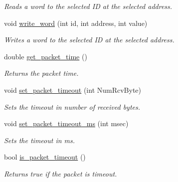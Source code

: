 \begin{DoxyCompactItemize}
\begin{DoxyCompactList}\small\item\em Reads a word to the selected I\+D at the selected address. \end{DoxyCompactList}\item 
void \hyperlink{classdynamixel_a925f62ce5e261e5ef4fe6dc46bdc7c63}{write\+\_\+word} (int id, int address, int value)
\begin{DoxyCompactList}\small\item\em Writes a word to the selected I\+D at the selected address. \end{DoxyCompactList}\item 
double \hyperlink{classdynamixel_a2fa5375537184c279a9ebfcfc0425071}{get\+\_\+packet\+\_\+time} ()
\begin{DoxyCompactList}\small\item\em Returns the packet time. \end{DoxyCompactList}\item 
void \hyperlink{classdynamixel_a067f82c21ed176e18fa224d16f3d1c5b}{set\+\_\+packet\+\_\+timeout} (int Num\+Rcv\+Byte)
\begin{DoxyCompactList}\small\item\em Sets the timeout in number of received bytes. \end{DoxyCompactList}\item 
void \hyperlink{classdynamixel_a125b42f776c4aac520f274074f68b591}{set\+\_\+packet\+\_\+timeout\+\_\+ms} (int msec)
\begin{DoxyCompactList}\small\item\em Sets the timeout in ms. \end{DoxyCompactList}\item 
bool \hyperlink{classdynamixel_a00d08481ebc4dee19debecf43f888522}{is\+\_\+packet\+\_\+timeout} ()
\begin{DoxyCompactList}\small\item\em Returns true if the packet is timeout. \end{DoxyCompactList}\end{DoxyCompactItemize}
